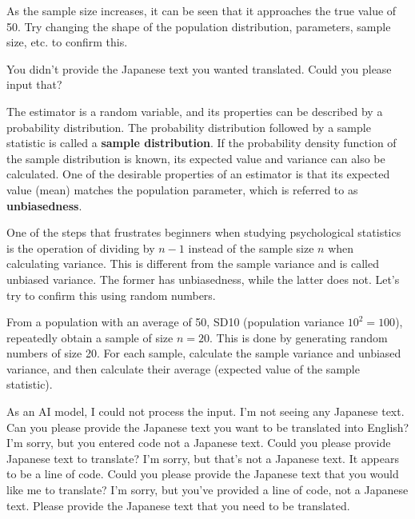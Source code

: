 \documentclass[
  a4paper,
]{book}
\begin{document}
As the sample size increases, it can be seen that it approaches the true
value of 50. Try changing the shape of the population distribution,
parameters, sample size, etc. to confirm this.

You didn't provide the Japanese text you wanted translated. Could you
please input that?

The estimator is a random variable, and its properties can be described
by a probability distribution. The probability distribution followed by
a sample statistic is called a \textbf{sample distribution}. If the
probability density function of the sample distribution is known, its
expected value and variance can also be calculated. One of the desirable
properties of an estimator is that its expected value (mean) matches the
population parameter, which is referred to as \textbf{unbiasedness}.

One of the steps that frustrates beginners when studying psychological
statistics is the operation of dividing by \(n-1\) instead of the sample
size \(n\) when calculating variance. This is different from the sample
variance and is called unbiased variance. The former has unbiasedness,
while the latter does not. Let's try to confirm this using random
numbers.

From a population with an average of 50, SD10 (population variance
\(10^2=100\)), repeatedly obtain a sample of size \(n=20\). This is done
by generating random numbers of size 20. For each sample, calculate the
sample variance and unbiased variance, and then calculate their average
(expected value of the sample statistic).

As an AI model, I could not process the input. I'm not seeing any
Japanese text. Can you please provide the Japanese text you want to be
translated into English? I'm sorry, but you entered code not a Japanese
text. Could you please provide Japanese text to translate? I'm sorry,
but that's not a Japanese text. It appears to be a line of code. Could
you please provide the Japanese text that you would like me to
translate? I'm sorry, but you've provided a line of code, not a Japanese
text. Please provide the Japanese text that you need to be translated.
\end{document}
